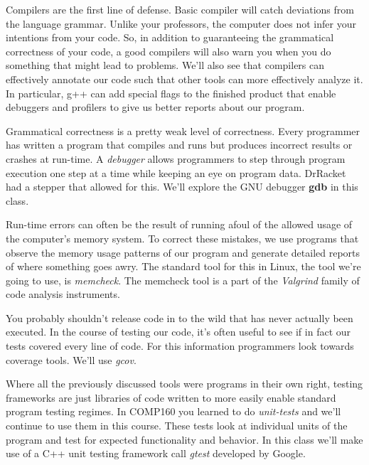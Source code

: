\documentclass[]{tufte-handout}
\begin{document}
Compilers are the first line of defense.  Basic compiler will catch deviations from the language grammar.  Unlike your professors, the computer does not infer your intentions from your code.  So, in addition to guaranteeing the grammatical correctness of your code, a good compilers will also warn you when you do something that might lead to problems.  We'll also see that compilers can effectively annotate our code such that other tools can more effectively analyze it. In particular, g++ can add special flags to the finished product that enable debuggers and profilers to give us better reports about our program.

Grammatical correctness is a pretty weak level of correctness. Every programmer has written a program that compiles and runs but produces incorrect results or crashes at run-time. A \textit{debugger} allows programmers to step through program execution one step at a time while keeping an eye on program data. DrRacket had a stepper that allowed for this. We'll explore the GNU debugger \textbf{gdb} in this class. 

Run-time errors can often be the result of running afoul of the allowed usage of the computer's memory system.  To correct these mistakes, we use programs that observe the memory usage patterns of our program and generate detailed reports of where something goes awry. The standard tool for this in Linux, the tool we're going to use, is \textit{memcheck}. The memcheck tool is a part of the \textit{Valgrind} family of code analysis instruments.

You probably shouldn't release code in to the wild that has never actually been executed.  In the course of testing our code, it's often useful to see if in fact our tests covered every line of code. For this information programmers look towards coverage tools. We'll use \textit{gcov}.

Where all the previously discussed tools were programs in their own right, testing frameworks are just libraries of code written to more easily enable standard program testing regimes.  In COMP160 you learned to do \textit{unit-tests} and we'll continue to use them in this course. These tests look at individual units of the program and test for expected functionality and behavior.  In this class we'll make use of a C++ unit testing framework call \textit{gtest} developed by Google.  
\end{document}
